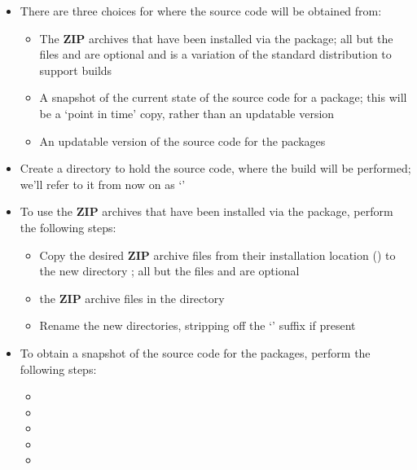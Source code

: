 \begin{itemize}
\item There are three choices for where the source code will be obtained from:
\begin{itemize}
\item The \textbf{ZIP} archives that have been installed via the 
package; all but the files  and
 are optional and 
is a variation of the standard \textbf{\yarp} distribution to support \ios{} builds
\item\exSp{}A snapshot of the current state of the source code for a package; this will be
a `point in time' copy, rather than an updatable version
\item\exSp{}An updatable version of the source code for the packages
\end{itemize}
\item\exSp{}Create a directory to hold the source code, where the build will be performed;
we'll refer to it from now on as `'
\item\exSp{}To use the \textbf{ZIP} archives that have been installed via the
 package, perform the following steps:
\begin{itemize}
\item Copy the desired \textbf{ZIP} archive files from their installation location
() to the new directory ; all but the files
 and  are optional
\item\exSp{} the \textbf{ZIP} archive files in the directory
\item\exSp{}Rename the new directories, stripping off the `' suffix if
present
\end{itemize}
\item\exSp{}To obtain a snapshot of the source code for the packages, perform the
following steps:
\begin{itemize}
\item {}
\item\exSp{}
\item\exSp{}
\item\exSp{}
\item\exSp{}

\end{itemize}
\end{itemize}

